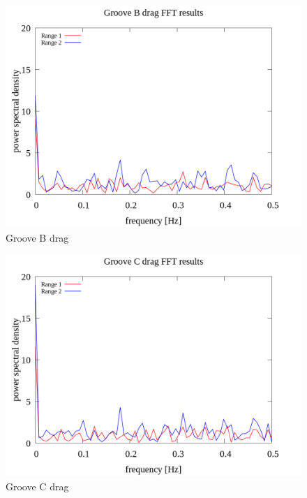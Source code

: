 \documentclass[a4paper]{jsarticle}
\begin{document}
\begin{figure}[htbp]
    \footnotesize
    \begin{center}
        \includegraphics[width=130mm]{../images/Groove_B_drag_08.png}
        \caption{Groove B drag}
    \end{center}
\end{figure}

\begin{figure}[htbp]
    \footnotesize
    \begin{center}
        \includegraphics[width=130mm]{../images/Groove_C_drag_08.png}
        \caption{Groove C drag}
    \end{center}
\end{figure}
\end{document}
